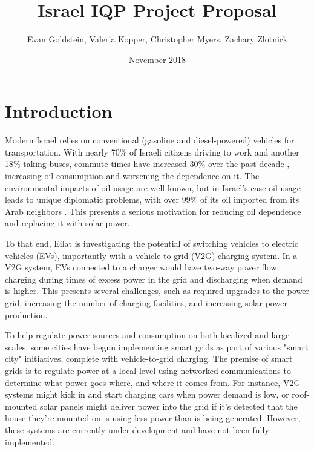 \documentclass{report}                         %
\title{Israel IQP Project Proposal}
\author{Evan Goldstein, Valeria Kopper, Christopher Myers, Zachary Zlotnick}
\date{November 2018}
\begin{document}
\maketitle

\renewcommand\abstractname{Summary} %

\tableofcontents
\newpage
{}

\doublespacing

\chapter{Introduction}

Modern Israel relies on conventional (gasoline and diesel-powered) vehicles for transportation. With nearly 70\% of Israeli citizens driving to work and another 18\% taking buses, commute times have increased 30\% over the past decade \cite{Dori2018IsraeliRoads}, increasing oil consumption and worsening the dependence on it. The environmental impacts of oil usage are well known, but in Israel's case oil usage leads to unique diplomatic problems, with over 99\% of its oil imported from its Arab neighbors \cite{Engber2006WhereOil}. This presents a serious motivation for reducing oil dependence and replacing it with solar power.

To that end, Eilat is investigating the potential of switching vehicles to electric vehicles (EVs), importantly with a vehicle-to-grid (V2G) charging system.  In a V2G system, EVs connected to a charger would have two-way power flow, charging during times of excess power in the grid and discharging when demand is higher. This presents several challenges, such as required upgrades to the power grid, increasing the number of charging facilities, and increasing solar power production.

To help regulate power sources and consumption on both localized and large scales, some cities have begun implementing smart grids as part of various "smart city" initiatives, complete with vehicle-to-grid charging. The premise of smart grids is to regulate power at a local level using networked communications to determine what power goes where, and where it comes from. For instance, V2G systems might kick in and start charging cars when power demand is low, or roof-mounted solar panels might deliver power into the grid if it's detected that the house they're mounted on is using less power than is being generated. However, these systems are currently under development \cite{2018Nuvve...} and have not been fully implemented.
\end{document}
